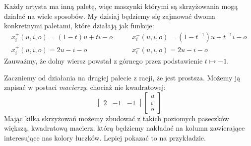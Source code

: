 \documentclass{article}
\begin{document}
Każdy artysta ma inną paletę, więc maszynki którymi są skrzyżowania mogą działać na wiele sposobów. My dzisiaj będziemy się zajmować dwoma konkretnymi paletami, które działają jak funkcje:
\begin{align*}
  x_i^+(u, i, o)=(1-t)u+ti-o \quad & \quad x_i^-(u,i,o)=(1-t^{-1})u+t^{-1}i-o\\ 
  x_i^+(u,i,o)=2u-i-o \quad & \quad x_i^-(u,i,o)=2u-i-o
\end{align*}
Zauważmy, że dolny wiersz powstał z górnego przez podstawienie $t\mapsto -1$.

Zaczniemy od działania na drugiej palecie z racji, że jest prostsza. Możemy ją zapisać w postaci \emph{macierzy}, chociaż nie kwadratowej:
$$\begin{bmatrix}2&-1&-1\end{bmatrix}\begin{bmatrix}u\\i\\o\end{bmatrix}$$
Mając kilka skrzyżowań możemy zbudować z takich poziomych paseczków większą, kwadratową macierz, którą będziemy nakładać na kolumn zawierające interesujące nas kolory łuczków. Lepiej pokazać to na przykładzie.

\begin{center}
\end{center}
\end{document}
